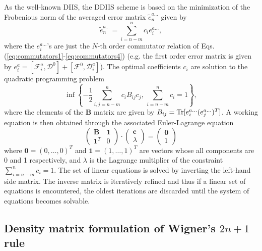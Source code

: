 \documentclass[prl,aps,letterpaper,twocolumn,showpacs,twocolumngrid,superbib]{revtex4}
\def\Tr{{\rm Tr}}
\def\F{\mathcal{F}}
\def\D{\mathcal{D}}
\begin{document}
As the well-known DIIS, the DDIIS scheme is based on the 
minimization of the Frobenious norm of the averaged error 
matrix $\widetilde e_n^{a\ldots}$ given by
\begin{equation}
  \widetilde e_n^{a\ldots}=\sum_{i=n-m}^{n}c_i e_i^{a\ldots},
\end{equation}
where the $e_i^{a\ldots}$'s are just the $N$-th order commutator relation
of Eqs. (\ref{eq:commutators1}-\ref{eq:commutators4}) (e.g. the first order error matrix 
is given by $e_i^{a}=[\F^{a}_i ,\D^{0}]+[\F^{0},\D^{a}_i]$).
The optimal coefficients $c_i$ are solution to the 
quadratic programming problem
\begin{equation}
  \inf \left \{-\frac{1}{2}\sum_{i,j=n-m}^nc_iB_{ij}c_j,\, \sum_{i=n-m}^n c_i=1 \right \},
\end{equation}
where the elements of the $\mathbf{B}$ matrix are given by 
$B_{ij}=\Tr[e_i^{a\ldots}(e_j^{a\ldots})^T]$.
A working equation is then obtained through the associated Euler-Lagrange equation
\begin{equation}\label{eq:diismatrix}
 \left ( \begin{array}{cc}
     \mathbf{B}     & \mathbf{1} \\
     \mathbf{1}^{T} & 0 
   \end{array}\right )
 \cdot \left ( \begin{array}{c}
     \mathbf{c}     \\
     \lambda  
   \end{array}\right )
  =  \left ( \begin{array}{c}
     \mathbf{0}      \\
         1  
   \end{array}\right )
\end{equation}
 where $\mathbf{0}=(0,\ldots,0)^{T}$ and $\mathbf{1}=(1,\ldots,1)^{T}$ are
 vectors whose all components are 0 and 1 respectively, 
 and $\lambda$ is the Lagrange multiplier of the constraint 
 $\sum_{i=n-m}^{n}c_{i}=1$. The set of linear equations is solved
 by inverting the left-hand side matrix. The inverse matrix is iteratively 
 refined and thus if a linear set of equations is encountered, the oldest
 iterations are discarded until the system of equations becomes solvable.

\subsection{Density matrix formulation of Wigner's $2n+1$ rule }\label{Wigner2Np1}
\end{document}
